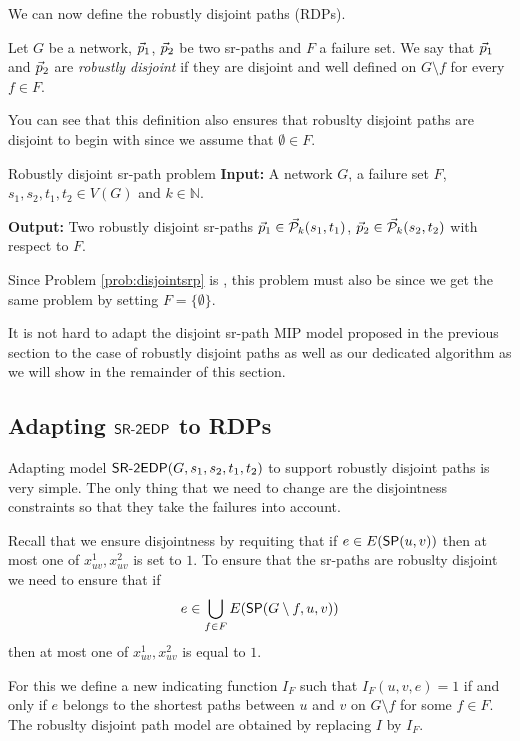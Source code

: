 We can now define the robustly disjoint paths (RDPs).

\begin{definition}
Let $G$ be a network, $\sr{p}_1$, $\sr{p}_2$ be two sr-paths and $F$ a failure set. We say that
$\sr{p}_1$ and $\sr{p}_2$ are \emph{robustly disjoint} if they are disjoint and well defined
on $G \setminus f$ for every $f \in F$.
\end{definition}

You can see that this definition also ensures that robuslty disjoint paths are 
disjoint to begin with since we assume that $\emptyset \in F$.

\begin{problem}{Robustly disjoint sr-path problem}
\label{prob:rdp}
\textbf{Input:} A network $G$, a failure set $F$, $s_1, s_2, t_1, t_2 \in V(G)$ and $k \in \mathbb{N}$.

\textbf{Output:} Two robustly disjoint sr-paths $\sr{p}_1 \in \Pk(s_1, t_1)$, $\sr{p}_2 \in \Pk(s_2, t_2)$ with respect to $F$.
\end{problem}

Since Problem \ref{prob:disjointsrp} is \NPhard, this problem must also be since we get the same problem
by setting $F = \{ \emptyset \}$.

It is not hard to adapt the disjoint sr-path MIP model proposed in the previous section 
to the case of robustly disjoint paths as well as our dedicated algorithm as we will show in the
remainder of this section.

\subsection{Adapting $\sredp$ to RDPs}

Adapting model $\sredp(G, s_1, s_2, t_1, t_2)$ to support robustly disjoint paths
is very simple. The only thing that we need to change are the disjointness constraints
so that they take the failures into account.

Recall that we ensure disjointness by requiting that if $e \in E(\sp(u, v))$ then
at most one of $x^1_{uv}, x^2_{uv}$ is set to $1$. To ensure that the sr-paths 
are robuslty disjoint we need to ensure that if
$$
e \in \bigcup_{f \in F} E(\sp(G \setminus f, u, v))
$$
then at most one of $x^1_{uv}, x^2_{uv}$ is equal to $1$.

For this we define a new indicating function $I_F$ such that $I_F(u, v, e) = 1$
if and only if $e$ belongs to the shortest paths between $u$ and $v$ 
on $G \setminus f$ for some $f \in F$. The robuslty disjoint path model
are obtained by replacing $I$ by $I_F$.


